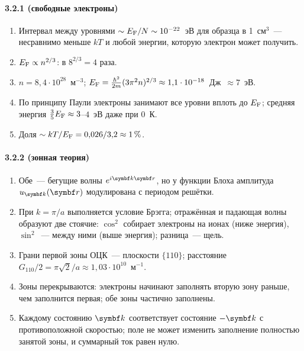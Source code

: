 {\paragraph{3.2.1 (свободные электроны)}
\begin{enumerate}[label=\arabic*.]
\item Интервал между уровнями $\sim E_{\mathrm{F}}/N\sim10^{-22}$~эВ для образца в
1~см$^3$~— несравнимо меньше $kT$ и любой энергии, которую электрон может
получить.
\item $E_{\mathrm{F}}\propto n^{2/3}$: в $8^{2/3}=4$ раза.
\item $n=8{,}4\cdot10^{28}$~м$^{-3}$; $E_{\mathrm{F}}=\frac{\hbar^2}{2m}(3\pi^2n)^{2/3}\approx1{,}1\cdot10^{-18}$~Дж~$\approx7$~эВ.
\item По принципу Паули электроны занимают все уровни вплоть до $E_{\mathrm{F}}$;
средняя энергия $\frac35E_{\mathrm{F}}\approx3$--$4$~эВ даже при 0~К.
\item Доля $\sim kT/E_{\mathrm{F}}=0{,}026/3{,}2\approx1\,\%$.
\end{enumerate}

\paragraph{3.2.2 (зонная теория)}
\begin{enumerate}[label=\arabic*.]
\item Обе~— бегущие волны $e^{i\vb k\vb r}$, но у функции Блоха амплитуда
$u_{\vb k}(\vb r)$ модулирована с периодом решётки.
\item При $k=\pi/a$ выполняется условие Брэгга; отражённая и падающая
волны образуют две стоячие: $\cos^2$ собирает электроны на ионах (ниже
энергия), $\sin^2$~— между ними (выше энергия); разница~— щель.
\item Грани первой зоны ОЦК~— плоскости $\{110\}$; расстояние
$G_{110}/2=\pi\sqrt2/a\approx1{,}03\cdot10^{10}$~м$^{-1}$.
\item Зоны перекрываются: электроны начинают заполнять вторую зону
раньше, чем заполнится первая; обе зоны частично заполнены.
\item Каждому состоянию $\vb k$ соответствует состояние $-\vb k$ с
противоположной скоростью; поле не может изменить заполнение
полностью занятой зоны, и суммарный ток равен нулю.
\end{enumerate}

}
